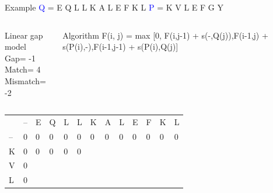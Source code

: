 \documentclass{bredelebeamer}
\begin{document}
 \begin{frame}{Example}
     \centering
 \textcolor{blue}{Q} = E Q L L K A L E F K L \quad \textcolor{blue}{P} = K V L E F G Y
\begin{columns}
\begin{block}{Linear gap model} \\
Gap= -1 \\
Match= 4 \\
Mismatch= -2
\end{block}
\begin{block}{Algorithm}
 F(i, j) = max [0, F(i,j-1) + s(-,Q(j)),F(i-1,j) + s(P(i),-),F(i-1,j-1) + s(P(i),Q(j)]
\end{block}
\end{columns}
     
     \begin{table}[]
\centering
\begin{tabular}{*{13}{p{0.4cm}}}
                        & --                     & E                      & Q                      & L                      & \cellcolor[HTML]{FF0000}L                      & K                      & A                      & L                      & E                      & F                      & K                      & L                      \\ \cline{2-13} 
\multicolumn{1}{l|}{--} & \multicolumn{1}{l|}{0} & \multicolumn{1}{l|}{0} & \multicolumn{1}{l|}{0} & \multicolumn{1}{l|}{0} & \multicolumn{1}{l|}{0} & \multicolumn{1}{l|}{0} & \multicolumn{1}{l|}{0} & \multicolumn{1}{l|}{0} & \multicolumn{1}{l|}{0} & \multicolumn{1}{l|}{0} & \multicolumn{1}{l|}{0} & \multicolumn{1}{l|}{0} \\ \cline{2-13} 
\multicolumn{1}{l|}{\cellcolor[HTML]{FFFF00}K}  & \multicolumn{1}{l|}{0} & \multicolumn{1}{l|}{0}  & \multicolumn{1}{l|}{0}  & \multicolumn{1}{l|}{0}  & \multicolumn{1}{l|}{0}  & \multicolumn{1}{l|}{}  & \multicolumn{1}{l|}{}  & \multicolumn{1}{l|}{}  & \multicolumn{1}{l|}{}  & \multicolumn{1}{l|}{}  & \multicolumn{1}{l|}{}  & \multicolumn{1}{l|}{}  \\ \cline{2-13} 
\multicolumn{1}{l|}{V}  & \multicolumn{1}{l|}{0} & \multicolumn{1}{l|}{}  & \multicolumn{1}{l|}{}  & \multicolumn{1}{l|}{}  & \multicolumn{1}{l|}{}  &    \multicolumn{1}{l|}{}  & \multicolumn{1}{l|}{}  & \multicolumn{1}{l|}{}  & \multicolumn{1}{l|}{}  & \multicolumn{1}{l|}{}  & \multicolumn{1}{l|}{}  & \multicolumn{1}{l|}{}  \\ \cline{2-13}  %
\multicolumn{1}{l|}{L}  & \multicolumn{1}{l|}{0} & \multicolumn{1}{l|}{}  & \multicolumn{1}{l|}{}  & \multicolumn{1}{l|}{}  & \multicolumn{1}{l|}{}  & \multicolumn{1}{l|}{}  & \multicolumn{1}{l|}{}  & \multicolumn{1}{l|}{}  & \multicolumn{1}{l|}{}  & \multicolumn{1}{l|}{}  & \multicolumn{1}{l|}{}  & \multicolumn{1}{l|}{}  \\ \cline{2-13} 

\end{tabular}
\end{table}
\end{frame}
\end{document}
